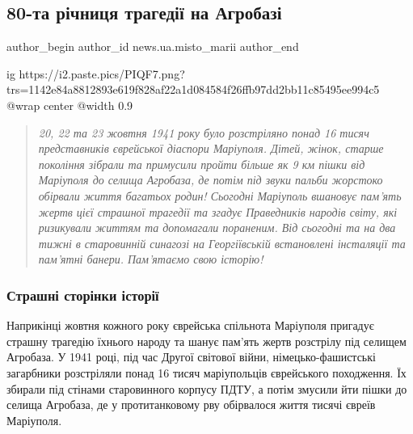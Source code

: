  
 
 
 
 
 
\subsection{80-та річниця трагедії на Агробазі}
\label{sec:26_10_2021.stz.news.ua.misto_marii.1.80_rokiv_tragedia_na_agrobazi}
 
\ifcmt
 author_begin
   author_id news.ua.misto_marii
 author_end
\fi

\ifcmt
  ig https://i2.paste.pics/PIQF7.png?trs=1142e84a8812893e619f828af22a1d084584f26ffb97dd2bb11c85495ee994c5
  @wrap center
  @width 0.9
\fi

\begin{quote}
\em
20, 22 та 23 жовтня 1941 року було розстріляно понад 16 тисяч представників
єврейської діаспори Маріуполя. Дітей, жінок, старше покоління зібрали та
примусили пройти більше як 9 км пішки від Маріуполя до селища Агробаза, де
потім під звуки пальби жорстоко обірвали життя багатьох родин! Сьогодні
Маріуполь вшановує пам'ять жертв цієї страшної трагедії та згадує Праведників
народів світу, які ризикували життям та допомагали пораненим. Від сьогодні та
на два тижні в старовинній синагозі на Георгіївській встановлені інсталяції та
пам'ятні банери. Пам'ятаємо свою історію! 
\end{quote}

\subsubsection{Страшні сторінки історії}


Наприкінці жовтня кожного року єврейська спільнота Маріуполя пригадує страшну
трагедію їхнього народу та шанує пам'ять жертв розстрілу під селищем Агробаза.
У 1941 році, під час Другої світової війни, німецько-фашистські загарбники
розстріляли понад 16 тисяч маріупольців єврейського походження. Їх збирали під
стінами старовинного корпусу ПДТУ, а потім змусили йти пішки до селища
Агробаза, де у протитанковому рву обірвалося життя тисячі євреїв Маріуполя.

